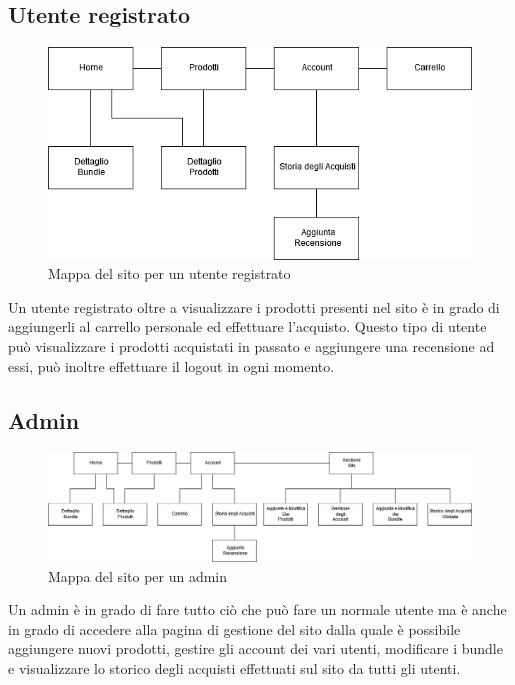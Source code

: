 \subsection{Utente registrato}
\begin{figure}[h]
	\label{UR} 
	\centering 
	\includegraphics[width=1\textwidth]{immagini/UR.png}
	\caption{Mappa del sito per un utente registrato} 
\end{figure}
Un utente registrato oltre a visualizzare i prodotti presenti nel sito è in grado di aggiungerli al carrello personale ed effettuare l'acquisto.
Questo tipo di utente può visualizzare i prodotti acquistati in passato e aggiungere una recensione ad essi, può inoltre effettuare il logout in ogni momento.

\subsection{Admin}
\begin{figure}[h]
	\label{admin} 
	\centering %
	\includegraphics[width=1\textwidth]{immagini/admin.png}
	\caption{Mappa del sito per un admin} 
\end{figure}
Un admin è in grado di fare tutto ciò che può fare un normale utente ma è anche in grado di accedere alla pagina di gestione del sito dalla quale è possibile aggiungere nuovi prodotti, gestire gli account dei vari utenti, modificare i bundle e visualizzare lo storico degli acquisti effettuati sul sito da tutti gli utenti.